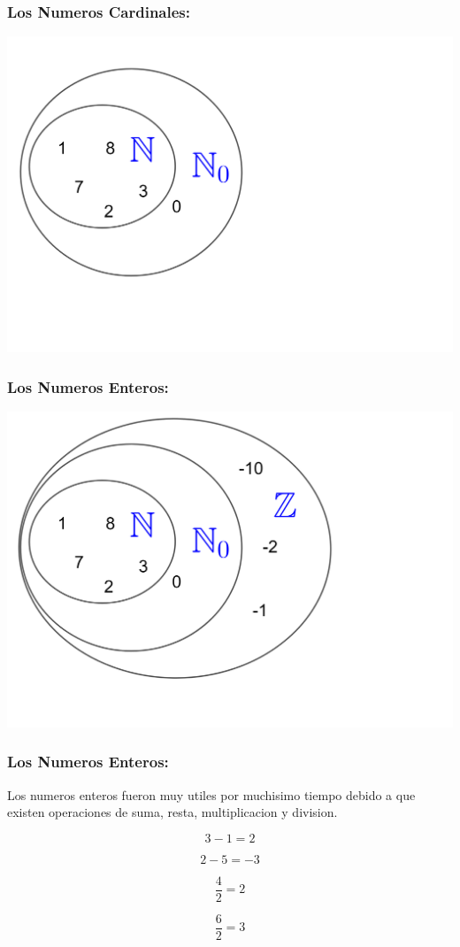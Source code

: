 \documentclass{beamer}
\theoremstyle{thmstyle}
\theoremstyle{thmstyle}
\theoremstyle{thmstyle}
\theoremstyle{mystyle}
\theoremstyle{qstnstyle}
\begin{document}
\begin{frame}
\frametitle{Los Numeros Cardinales:}
\begin{center}
\includegraphics[width=\linewidth]{Image2.png}
\end{center}
\end{frame}

\begin{frame}
\frametitle{Los Numeros Enteros:}
\begin{center}
\includegraphics[width=\linewidth]{Image3.png}
\end{center}
\end{frame}


\begin{frame}
\frametitle{Los Numeros Enteros:}
Los numeros enteros fueron  muy utiles por muchisimo tiempo debido a que existen operaciones de suma, resta, multiplicacion y division.

$$3-1 =2 $$

$$2-5=-3 $$

$$\frac{4}{2}=2 $$

$$\frac{6}{2}=3 $$
\end{frame}
\end{document}
